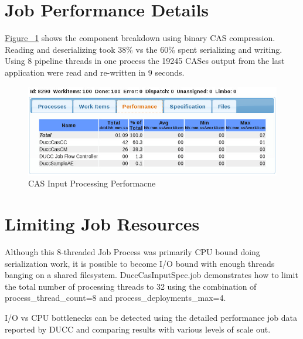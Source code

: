 \section{Job Performance Details}
\hyperref[fig:CAS-Input-Processing]{Figure ~\ref{fig:CAS-Input-Processing}} shows the component breakdown
using binary CAS compression. Reading and deserializing took 38\% vs the 60\% spent serializing and writing.
Using 8 pipeline threads in one process the 19245 CASes output from the last application were read and 
re-written in 9 seconds.

\begin{figure}[H]
  \centering
  \includegraphics[width=5.5in]{images/BooksCasPerf.png}
  \caption{CAS Input Processing Performacne}
  \label{fig:CAS-Input-Processing}
\end{figure}

\section{Limiting Job Resources}
Although this 8-threaded Job Process was primarily CPU bound doing serialization work, it is possible to become I/O bound 
with enough threads banging on a shared filesystem.
DuccCasInputSpec.job demonstrates how to limit the total number of processing threads to 32 using the combination 
of process\_thread\_count=8 and process\_deployments\_max=4.

I/O vs CPU bottlenecks can be detected using the detailed performance job data reported by DUCC and comparing results
with various levels of scale out.

